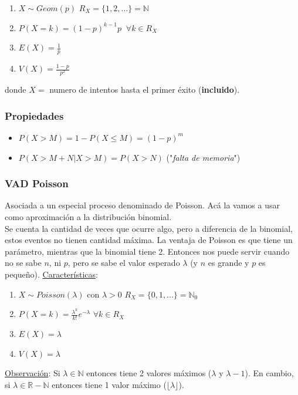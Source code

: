 \documentclass{article}
\newcommand{\naturales}{\mathbb{N}}                     %
\newcommand{\reales}{\mathbb{R}}                        %
\begin{document}
\begin{enumerate}
    \item $X \sim Geom(p)$
        \subitem $R_X = \{ 1, 2, ... \} = \naturales$

    \item $P(X = k) = (1 - p)^{k-1} p \;\; \forall k \in R_X$
    \item $E(X) = \frac{1}{p}$
    \item $V(X) = \frac{1-p}{p^2}$
\end{enumerate}
donde $X =$ numero de intentos hasta el primer éxito (\textbf{incluido}).
\subsubsection*{Propiedades}
\begin{itemize}
    \item $P(X > M) = 1 - P(X \leq M) = (1 - p)^m$
    \item $P(X > M + N | X > M) = P(X > N)$ ("\emph{falta de memoria}")
\end{itemize}



\subsubsection{VAD Poisson}
Asociada a un especial proceso denominado de Poisson.  Acá la vamos a usar como aproximación a la distribución binomial.
\\Se cuenta la cantidad de veces que ocurre algo, pero a diferencia de la binomial, estos eventos no tienen cantidad máxima. La ventaja de Poisson es que tiene un parámetro, mientras que la binomial tiene 2. Entonces nos puede servir cuando no se sabe $n$, ni $p$, pero se sabe el valor esperado $\lambda$ (y $n$ es grande y $p$ es pequeño).
\underline{Características}:
\begin{enumerate}
    \item $X \sim Poisson(\lambda)$ con $\lambda > 0$
        \subitem $R_X = \{ 0,1,...\} = \naturales_0$
    \item $P(X=k) = \frac{\lambda^k}{k!}e^{-\lambda}$ $\forall k \in R_X$
    \item $E(X) = \lambda$
    \item $V(X) = \lambda$
\end{enumerate}
\underline{Observación}: Si $\lambda \in \naturales$ entonces tiene 2 valores máximos ($\lambda$ y $\lambda - 1$). En cambio, si $\lambda \in \reales - \naturales$ entonces tiene 1 valor máximo ($\lfloor \lambda \rfloor$).
\end{document}

